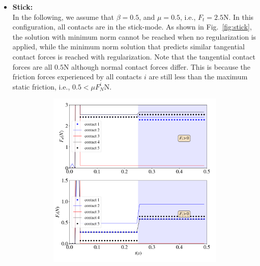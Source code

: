 \begin{itemize}
	\item 	\textbf{Stick:}\\
	In the following, we assume that $\beta=0.5$, and $\mu=0.5$, i.e., $F_t=2.5$\si{N}. In this configuration, all contacts are in the stick-mode. As shown in Fig.~\ref{fig:stick}, the solution with minimum norm cannot be reached when no regularization is applied, while the minimum norm solution that predicts similar tangential contact forces is reached with regularization. Note that the tangential contact forces are all $0.5$\si{N} although normal contact forces differ. This is because the friction forces experienced by all contacts $i$ are still less than the maximum static friction, i.e.,  $ 0.5<\mu F^i_N$\si{N}.
	\begin{figure}[H]
		\centering	
		\begin{subfigure}{0.48\columnwidth}	
			\centering
			\includegraphics[width=1.\textwidth]{images/CD/stick.png}
		\end{subfigure}	
		\begin{subfigure}{0.48\columnwidth}	
			\centering

\end{subfigure}
\end{figure}
\end{itemize}
